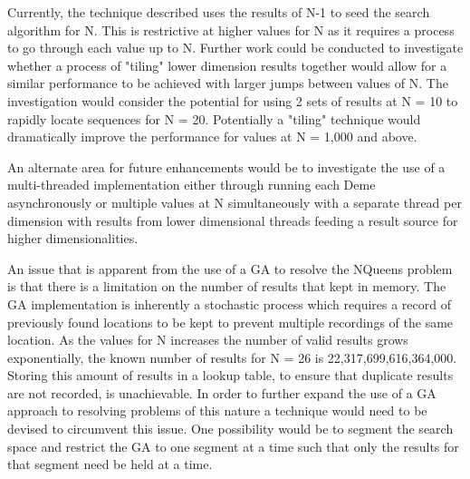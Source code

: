 \documentclass[a4paper,onecolumn,11pt]{article}
\begin{document}
Currently, the technique described uses the results of N-1 to seed the search algorithm for N. This is restrictive at higher values for N as it requires a process to go through each value up to N. Further work could be conducted to investigate whether a process of "tiling" lower dimension results together would allow for a similar performance to be achieved with larger jumps between values of N. The investigation would consider the potential for using 2 sets of results at N = 10 to rapidly locate sequences for N = 20. Potentially a "tiling" technique would dramatically improve the performance for values at N = 1,000 and above.

An alternate area for future enhancements would be to investigate the use of a multi-threaded implementation either through running each Deme asynchronously or multiple values at N simultaneously with a separate thread per dimension with results from lower dimensional threads feeding a result source for higher dimensionalities.

An issue that is apparent from the use of a GA to resolve the NQueens problem is that there is a limitation on the number of results that kept in memory. The GA implementation is inherently a stochastic process which requires a record of previously found locations to be kept to prevent multiple recordings of the same location. As the values for N increases the number of valid results grows exponentially, the known number of results for N = 26 is 22,317,699,616,364,000. Storing this amount of results in a lookup table, to ensure that duplicate results are not recorded, is unachievable. In order to further expand the use of a GA approach to resolving problems of this nature a technique would need to be devised to circumvent this issue. One possibility would be to segment the search space and restrict the GA to one segment at a time such that only the results for that segment need be held at a time.
\end{document}
